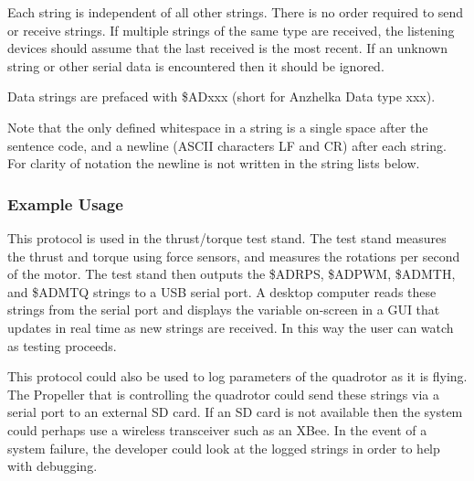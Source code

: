 \documentclass{article}
\numberwithin{equation}{section} %
\begin{document}
Each string is independent of all other strings. There is no order required to send or receive strings. If multiple strings of the same type are received, the listening devices should assume that the last received is the most recent. If an unknown string or other serial data is encountered then it should be ignored.

Data strings are prefaced with \$ADxxx (short for Anzhelka Data type xxx). 

Note that the only defined whitespace in a string is a single space after the sentence code, and a newline (ASCII characters LF and CR) after each string. For clarity of notation the newline is not written in the string lists below.

\subsubsection{Example Usage}
This protocol is used in the thrust/torque test stand. The test stand measures the thrust and torque using force sensors, and measures the rotations per second of the motor. The test stand then outputs the \$ADRPS, \$ADPWM, \$ADMTH, and \$ADMTQ strings to a USB serial port. A desktop computer reads these strings from the serial port and displays the variable on-screen in a GUI that updates in real time as new strings are received. In this way the user can watch as testing proceeds.

This protocol could also be used to log parameters of the quadrotor as it is flying. The Propeller that is controlling the quadrotor could send these strings via a serial port to an external SD card. If an SD card is not available then the system could perhaps use a wireless transceiver such as an XBee. In the event of a system failure, the developer could look at the logged strings in order to help with debugging. 
\end{document}
